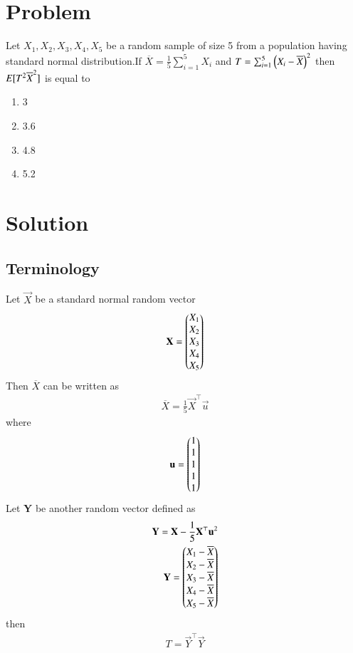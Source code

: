 \documentclass[journal,12pt,twocolumn]{IEEEtran}
\begin{document}
\section{Problem}
Let $X_1,X_2,X_3,X_4,X_5$ be a random sample of size 5 from a population having standard normal distribution.If 
$\overline{X}=\frac{1}{5}\sum_{i=1}^5 X_i$ and $T=\sum_{i=1}^5\left(X_i-\overline{X}\right)^2$
then $E[ T^2\overline{X}^2 ]$ is equal to 
\begin{enumerate}
    \item 3
    \item 3.6
    \item 4.8
    \item 5.2
\end{enumerate}
\section{Solution}
\subsection{Terminology}
Let $\vec{X}$ be a standard normal random vector 
\begin{align}
    \mathbf{X}=\begin{pmatrix}X_1\\
             X_2\\
             X_3\\
             X_4\\
             X_5\end{pmatrix}
\end{align}
Then $\overline{X}$ can be written as
\begin{align}
    \overline{X}=\frac{1}{5}\vec{X}^{\top}\vec{u}
\end{align}
where 
\begin{align}
    \mathbf{u}=\begin{pmatrix}1\\
                      1\\
                      1\\
                      1\\
                      1\end{pmatrix}
\end{align}
Let \textbf{Y} be another random vector defined as
\begin{align}
     \mathbf{Y}=\mathbf{X}-\frac{1}{5}\mathbf{X}^{\top}\mathbf{u}^2\\
     \mathbf{Y}=\begin{pmatrix}X_1-\overline{X}\\X_2-\overline{X}\\X_3-\overline{X}\\X_4-\overline{X}\\X_5-\overline{X}\end{pmatrix}
\end{align}
then
\begin{align}
    T=\vec{Y}^{\top}\vec{Y}
\end{align}
\end{document}
